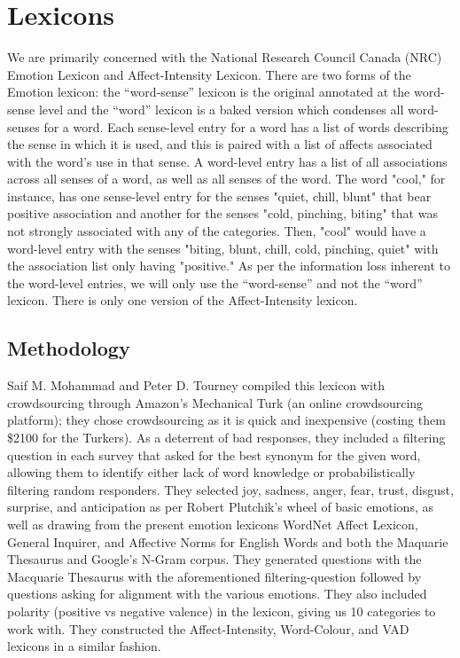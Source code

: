 \documentclass[11pt, twoside, reqno]{book}
\begin{document}
\section{Lexicons}

We are primarily concerned with the National Research Council Canada (NRC) Emotion Lexicon and Affect-Intensity Lexicon. There are two forms of the Emotion lexicon: the ``word-sense'' lexicon is the original annotated at the word-sense level and the ``word'' lexicon is a baked version which condenses all word-senses for a word. Each sense-level entry for a word has a list of words describing the sense in which it is used, and this is paired with a list of affects associated with the word's use in that sense. A word-level entry has a list of all associations across all senses of a word, as well as all senses of the word. The word "cool," for instance, has one sense-level entry for the senses "quiet, chill, blunt" that bear positive association and another for the senses "cold, pinching, biting" that was not strongly associated with any of the categories. Then, "cool" would have a word-level entry with the senses "biting, blunt, chill, cold, pinching, quiet" with the association list only having "positive." As per the information loss inherent to the word-level entries, we will only use the ``word-sense'' and not the ``word'' lexicon. There is only one version of the Affect-Intensity lexicon.

\subsection{Methodology}

Saif M. Mohammad and Peter D. Tourney compiled this lexicon with crowdsourcing through Amazon's Mechanical Turk (an online crowdsourcing platform); they chose crowdsourcing as it is quick and inexpensive (costing them \$2100 for the Turkers). As a deterrent of bad responses, they included a filtering question in each survey that asked for the best synonym for the given word, allowing them to identify either lack of word knowledge or probabilistically filtering random responders. They selected joy, sadness, anger, fear, trust, disgust, surprise, and anticipation as per Robert Plutchik's wheel of basic emotions, as well as drawing from the present emotion lexicons WordNet Affect Lexicon, General Inquirer, and Affective Norms for English Words and both the Maquarie Thesaurus and Google's N-Gram corpus. They generated questions with the Macquarie Thesaurus with the aforementioned filtering-question followed by questions asking for alignment with the various emotions. They also included polarity (positive vs negative valence) in the lexicon, giving us 10 categories to work with. They constructed the Affect-Intensity, Word-Colour, and VAD lexicons in a similar fashion.
\end{document}

